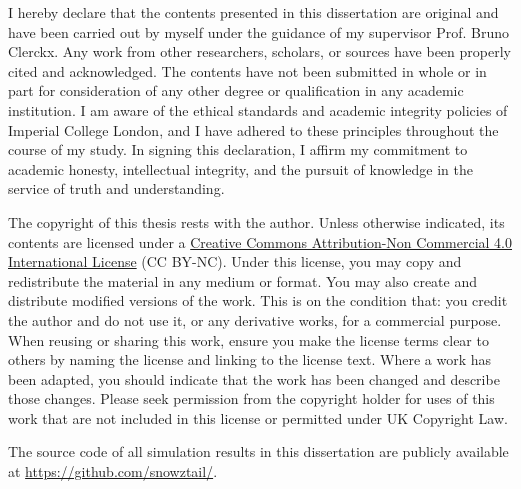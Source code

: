 
\begin{declaration}

I hereby declare that the contents presented in this dissertation are original and have been carried out by myself under the guidance of my supervisor Prof. Bruno Clerckx.
Any work from other researchers, scholars, or sources have been properly cited and acknowledged.
The contents have not been submitted in whole or in part for consideration of any other degree or qualification in any academic institution.
I am aware of the ethical standards and academic integrity policies of Imperial College London, and I have adhered to these principles throughout the course of my study.
In signing this declaration, I affirm my commitment to academic honesty, intellectual integrity, and the pursuit of knowledge in the service of truth and understanding.

The copyright of this thesis rests with the author. Unless otherwise indicated, its contents are licensed under a \href{https://creativecommons.org/licenses/by-nc/4.0/deed.en}{Creative Commons Attribution-Non Commercial 4.0 International License} (CC BY-NC). Under this license, you may copy and redistribute the material in any medium or format. You may also create and distribute modified versions of the work. This is on the condition that: you credit the author and do not use it, or any derivative works, for a commercial purpose. When reusing or sharing this work, ensure you make the license terms clear to others by naming the license and linking to the license text. Where a work has been adapted, you should indicate that the work has been changed and describe those changes. Please seek permission from the copyright holder for uses of this work that are not included in this license or permitted under UK Copyright Law.

The source code of all simulation results in this dissertation are publicly available at \url{https://github.com/snowztail/}.

\end{declaration}
